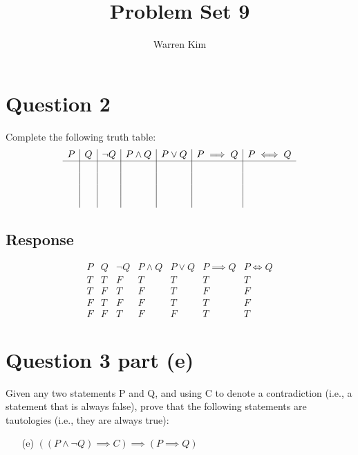 \documentclass[13pt]{article}
\title{Problem Set 9}
\author{Warren Kim}
\begin{document}
\maketitle

\newpage
\section*{Question 2}
Complete the following truth table:
\[
  \begin{array}{c|c|c|c|c|c|c}
    P & Q & \neg Q & P \land Q & P \lor Q & P \implies Q & P \iff Q \\
    \hline
      &  &  &  &  &  &  \\
      &  &  &  &  &  &  \\
      &  &  &  &  &  &  \\
      &  &  &  &  &  & 
  \end{array}
\]

\subsection*{Response}
\[
  \begin{array}{c|c|c|c|c|c|c}
    P & Q & \neg Q & P \land Q & P \lor Q & P \implies Q & P \iff Q \\
    \hline
    T & T & F & T & T & T & T \\
    T & F & T & F & T & F & F \\
    F & T & F & F & T & T & F \\
    F & F & T & F & F & T & T
  \end{array}
\]





\newpage
\section*{Question 3 part (e)}
Given any two statements P and Q, and using C to denote a contradiction (i.e., a
statement that is always false), prove that the following statements are tautologies (i.e.,
they are always true):
\begin{enumerate}
\item [(e)] $((P \land \neg Q) \implies C) \implies (P \implies Q)$
\end{enumerate}
\end{document}
